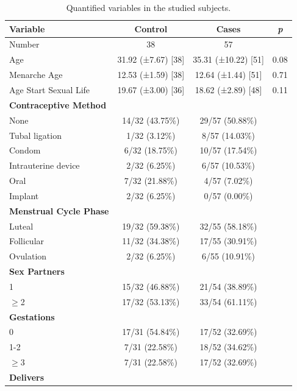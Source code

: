 \documentclass[biotech,article,submit,pdftex,moreauthors]{Definitions/mdpi}
\begin{document}
\begin{table}[H]
    \centering
    \caption{Quantified variables in the studied subjects.}
    \label{tab:metadata}
    \begin{tabular}{@{}lccc}
    	\toprule
    	\textbf{Variable} & \textbf{Control} & \textbf{Cases} & \textbf{\textit{p}} \\
        \midrule
        Number & 38 & 57 & \\
        Age & 31.92 (±7.67) [38] & 35.31 (±10.22) [51] & 0.08 \\
        Menarche Age & 12.53 (±1.59) [38] & 12.64 (±1.44) [51] & 0.71 \\
        Age Start Sexual Life & 19.67 (±3.00) [36] & 18.62 (±2.89) [48] & 0.11 \\
        \midrule
        \textbf{Contraceptive Method} & & & \\
        None & 14/32 (43.75\%) & 29/57 (50.88\%) & \\
        Tubal ligation & 1/32 (3.12\%) & 8/57 (14.03\%) & \\
        Condom & 6/32 (18.75\%) & 10/57 (17.54\%) & \\
        Intrauterine device & 2/32 (6.25\%) & 6/57 (10.53\%) & \\
        Oral & 7/32 (21.88\%) & 4/57 (7.02\%) & \\
        Implant & 2/32 (6.25\%) & 0/57 (0.00\%) & \\
        \midrule
        \textbf{Menstrual Cycle Phase} & & & \\
        Luteal & 19/32 (59.38\%) & 32/55 (58.18\%) & \\
        Follicular & 11/32 (34.38\%) & 17/55 (30.91\%) & \\
        Ovulation & 2/32 (6.25\%) & 6/55 (10.91\%) & \\
        \textbf{Sex Partners} & & & \\
        1 & 15/32 (46.88\%) & 21/54 (38.89\%) & \\
        $\geq$2 & 17/32 (53.13\%) & 33/54 (61.11\%) & \\
        \midrule
        \textbf{Gestations} & & & \\
        0 & 17/31 (54.84\%) & 17/52 (32.69\%) & \\
        1-2 & 7/31 (22.58\%) & 18/52 (34.62\%) & \\
        $\geq$3 & 7/31 (22.58\%) & 17/52 (32.69\%) & \\
        \midrule
        \textbf{Delivers} & & & \\

\end{tabular}
\end{table}
\end{document}
